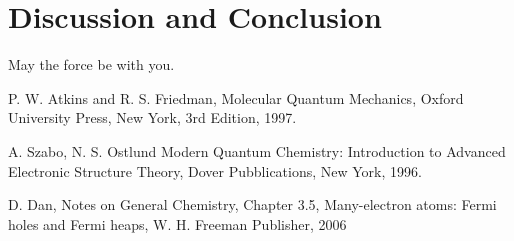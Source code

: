 \documentclass[a4paper,12pt]{article}
\begin{document}
\section{Discussion and Conclusion}

May the force be with you.



\clearpage
{}
\begin{thebibliography}{9}


%
%

P. W. Atkins and R. S. Friedman,
Molecular Quantum Mechanics,
Oxford University Press, New York,
3rd Edition,
1997.

A. Szabo, N. S. Ostlund
Modern Quantum Chemistry: Introduction to Advanced Electronic Structure Theory,
Dover Pubblications, New York,
1996.

D. Dan, Notes on General Chemistry,
Chapter 3.5, Many-electron atoms: Fermi holes and Fermi heaps,
W. H. Freeman Publisher,
2006


\end{thebibliography}
\end{document}
